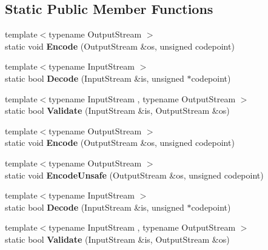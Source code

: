 \subsection*{Static Public Member Functions}
\begin{DoxyCompactItemize}
\item 
\mbox{\label{structUTF16_a9d8ded01244e30d037c4afa10ee2b30e}} 
{\footnotesize template$<$typename Output\+Stream $>$ }\\static void {\bfseries Encode} (Output\+Stream \&os, unsigned codepoint)
\item 
\mbox{\label{structUTF16_a124c79dfd9f9b4c3fb65bd55ba17b4be}} 
{\footnotesize template$<$typename Input\+Stream $>$ }\\static bool {\bfseries Decode} (Input\+Stream \&is, unsigned $\ast$codepoint)
\item 
\mbox{\label{structUTF16_a7516184ed5dce10c0e7895bec124d97d}} 
{\footnotesize template$<$typename Input\+Stream , typename Output\+Stream $>$ }\\static bool {\bfseries Validate} (Input\+Stream \&is, Output\+Stream \&os)
\item 
\mbox{\label{structUTF16_a9d8ded01244e30d037c4afa10ee2b30e}} 
{\footnotesize template$<$typename Output\+Stream $>$ }\\static void {\bfseries Encode} (Output\+Stream \&os, unsigned codepoint)
\item 
\mbox{\label{structUTF16_aa67661e756c273871b574e7133b7fc63}} 
{\footnotesize template$<$typename Output\+Stream $>$ }\\static void {\bfseries Encode\+Unsafe} (Output\+Stream \&os, unsigned codepoint)
\item 
\mbox{\label{structUTF16_a124c79dfd9f9b4c3fb65bd55ba17b4be}} 
{\footnotesize template$<$typename Input\+Stream $>$ }\\static bool {\bfseries Decode} (Input\+Stream \&is, unsigned $\ast$codepoint)
\item 
\mbox{\label{structUTF16_a7516184ed5dce10c0e7895bec124d97d}} 
{\footnotesize template$<$typename Input\+Stream , typename Output\+Stream $>$ }\\static bool {\bfseries Validate} (Input\+Stream \&is, Output\+Stream \&os)
\end{DoxyCompactItemize}


